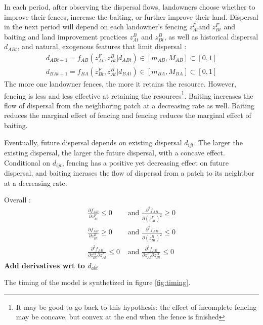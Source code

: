 \documentclass{article}
\begin{document}
In each period, after observing the dispersal flows, landowners choose whether to improve their fences, increase the baiting, or further improve their land. 
Dispersal in the next period will depend on each landowner's fencing $z_{At}^F$and $z_{Bt}^F$ and baiting and land improvement practices $z_{At}^B$ and $z_{Bt}^B$, as well as historical dispersal $d_{ABt}$, and natural, exogenous features that limit dispersal : 
\begin{align}
    d_{ABt+1} = f_{AB}(z^F_{At}, z^B_{Bt}| d_{ABt}) \in [m_{AB},M_{AB}] \subset [0,1] \\
    d_{BAt+1} = f_{BA}(z^F_{Bt}, z^B_{At}| d_{BAt}) \in [m_{BA},M_{BA}] \subset [0,1]
\end{align}
The more one landowner fences, the more it retains the resource. However, fencing is less and less effective at retaining the resources\footnote{It may be good to go back to this hypothesis: the effect of incomplete fencing may be concave, but convex at the end when the fence is finished}. Baiting increases the flow of dispersal from the neighboring patch at a decreasing rate as well. Baiting reduces the marginal effect of fencing and fencing reduces the marginal effect of baiting.

Eventually, future dispersal depends on existing dispersal $d_{ijt}$. The larger the existing dispersal, the larger the future dispersal, with a concave effect. Conditional on $d_{ijt}$, fencing has a positive yet decreasing effect on future dispersal, and baiting incrases the flow of dispersal from a patch to its neightbor at a decreasing rate. 


 Overall : 
\begin{align*}
    \frac{\partial f_{AB}}{\partial z^F_{At}}\leq 0 &\text{ and } \frac{\partial^2 f_{AB}}{\partial (z^F_{At})^2} \geq 0\\
    \frac{\partial f_{AB}}{\partial z^B_{Bt}}\geq 0 &\text{ and } \frac{\partial^2 f_{AB}}{\partial (z^B_{Bt})^2} \leq 0\\
    \frac{\partial ^2 f_{AB}}{\partial z_{Bt}^B\partial z_{At}^F} \leq 0 &\text{ and } \frac{\partial ^2 f_{AB}}{\partial z_{At}^F\partial z_{Bt}^B} \leq 0
\end{align*}
\textbf{Add derivatives wrt to $d_{abt}$}


The timing of the model is synthetized in figure \ref{fig:timing}.
\end{document}
